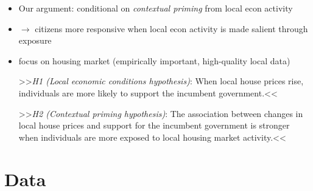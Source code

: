 \documentclass[10pt,aspectratio=169]{beamer}
\begin{document}
\begin{frame}
\begin{itemize}[<+->]
	\item Our argument: conditional on \textit{contextual priming} from local econ activity	
	\item $\rightarrow$ citizens more responsive when local econ activity is made salient through exposure
	\item focus on housing market (empirically important, high-quality local data)
	\begin{exampleblock}{}
		>>\textit{H1 (Local economic conditions hypothesis)}: When local house prices rise, individuals are more likely to support the incumbent government.<<
	\end{exampleblock}
	\begin{exampleblock}{}
		>>\textit{H2 (Contextual priming hypothesis)}: The association between changes in local house prices and support for the incumbent government is stronger when individuals are more exposed to local housing market activity.<<
	\end{exampleblock}

\end{itemize}

\end{frame}

\section{Data}
\end{document}

